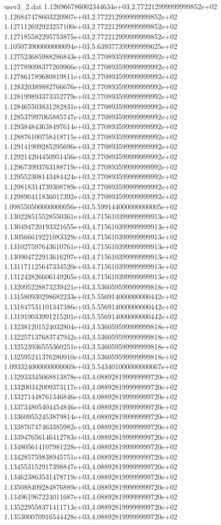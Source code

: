 \begin{filecontents}{user3_2.dat}
1.126966786002344634e+03,2.772212999999999852e+02
1.126847478603220907e+03,2.772212999999999852e+02
1.127112692923257100e+03,2.772212999999999852e+02
1.127185582295753875e+03,2.772212999999999852e+02
1.105073900000000094e+03,5.639377399999999625e+02
1.127523685988286843e+03,2.770893599999999992e+02
1.127789098377269966e+03,2.770893599999999992e+02
1.127861789680819811e+03,2.770893599999999992e+02
1.128320389882766676e+03,2.770893599999999992e+02
1.128199893373352779e+03,2.770893599999999992e+02
1.128465503831282831e+03,2.770893599999999992e+02
1.128537997065885747e+03,2.770893599999999992e+02
1.129384843638497614e+03,2.770893599999999992e+02
1.128876100758418715e+03,2.770893599999999992e+02
1.129141909285295696e+03,2.770893599999999992e+02
1.129214204450951456e+03,2.770893599999999992e+02
1.129673993763188719e+03,2.770893599999999992e+02
1.129552308143484424e+03,2.770893599999999992e+02
1.129818314739308789e+03,2.770893599999999992e+02
1.129890411836017392e+03,2.770893599999999992e+02
1.098550500000000056e+03,5.599144000000000005e+02
1.130228515528550361e+03,4.715610399999999913e+02
1.130494720193321655e+03,4.715610399999999913e+02
1.130566619221083329e+03,4.715610399999999913e+02
1.131027597643610761e+03,4.715610399999999913e+02
1.130904722913616297e+03,4.715610399999999913e+02
1.131171125647334520e+03,4.715610399999999913e+02
1.131242826606149265e+03,4.715610399999999913e+02
1.132095228873239421e+03,3.536059599999999818e+02
1.131580930298682233e+03,5.556914000000000442e+02
1.131847531101347386e+03,5.556914000000000442e+02
1.131919033991215201e+03,5.556914000000000442e+02
1.132381201524032804e+03,3.536059599999999818e+02
1.132257137683747942e+03,3.536059599999999818e+02
1.132523936555360251e+03,3.536059599999999818e+02
1.132595241376280910e+03,3.536059599999999818e+02
1.093324000000000069e+03,5.543401000000000067e+02
1.132933345068813878e+03,4.088928199999999720e+02
1.133200342009373117e+03,4.088928199999999720e+02
1.133271448761346846e+03,4.088928199999999720e+02
1.133734805404454846e+03,4.088928199999999720e+02
1.133609552453879814e+03,4.088928199999999720e+02
1.133876747463385982e+03,4.088928199999999720e+02
1.133947656146412783e+03,4.088928199999999720e+02
1.134805614107981228e+03,4.088928199999999720e+02
1.134285759838945751e+03,4.088928199999999720e+02
1.134553152917398847e+03,4.088928199999999720e+02
1.134623863531478719e+03,4.088928199999999720e+02
1.135088409284876889e+03,4.088928199999999720e+02
1.134961967224011687e+03,4.088928199999999720e+02
1.135229558371411713e+03,4.088928199999999720e+02
1.135300070916544428e+03,4.088928199999999720e+02

\end{filecontents}
